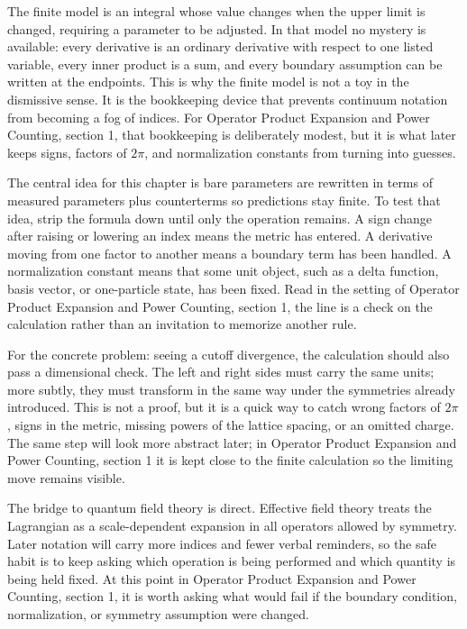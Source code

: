 The finite model is an integral whose value changes when the upper limit is changed, requiring a parameter to be adjusted.  In that model no mystery is available: every derivative is an ordinary derivative with respect to one listed variable, every inner product is a sum, and every boundary assumption can be written at the endpoints.  This is why the finite model is not a toy in the dismissive sense.  It is the bookkeeping device that prevents continuum notation from becoming a fog of indices.  For Operator Product Expansion and Power Counting, section 1, that bookkeeping is deliberately modest, but it is what later keeps signs, factors of \(2\pi\), and normalization constants from turning into guesses.

The central idea for this chapter is bare parameters are rewritten in terms of measured parameters plus counterterms so predictions stay finite.  To test that idea, strip the formula down until only the operation remains.  A sign change after raising or lowering an index means the metric has entered.  A derivative moving from one factor to another means a boundary term has been handled.  A normalization constant means that some unit object, such as a delta function, basis vector, or one-particle state, has been fixed.  Read in the setting of Operator Product Expansion and Power Counting, section 1, the line is a check on the calculation rather than an invitation to memorize another rule.

For the concrete problem: seeing a cutoff divergence, the calculation should also pass a dimensional check.  The left and right sides must carry the same units; more subtly, they must transform in the same way under the symmetries already introduced.  This is not a proof, but it is a quick way to catch wrong factors of \(2\pi\), signs in the metric, missing powers of the lattice spacing, or an omitted charge.  The same step will look more abstract later; in Operator Product Expansion and Power Counting, section 1 it is kept close to the finite calculation so the limiting move remains visible.

The bridge to quantum field theory is direct.  Effective field theory treats the Lagrangian as a scale-dependent expansion in all operators allowed by symmetry.  Later notation will carry more indices and fewer verbal reminders, so the safe habit is to keep asking which operation is being performed and which quantity is being held fixed.  At this point in Operator Product Expansion and Power Counting, section 1, it is worth asking what would fail if the boundary condition, normalization, or symmetry assumption were changed.

